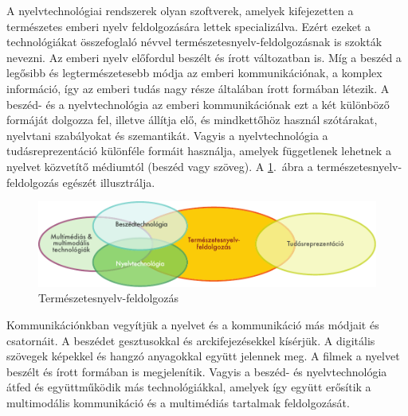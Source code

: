   \clearpage



  \begin{multicols}{2}

  A nyelvtechnológiai rendszerek olyan szoft\-ve\-rek, amelyek kifejezetten a természetes emberi nyelv feldolgozására lettek specializálva. Ezért ezeket a technológiákat összefoglaló névvel természetesnyelv-fel\-dol\-go\-zás\-nak is szokták nevezni. Az emberi nyelv előfordul beszélt és írott változatban is. Míg a beszéd a legősibb és legtermészetesebb módja az emberi kommunikációnak, a komplex információ, így az emberi tudás nagy része általában írott formában létezik. A beszéd- és a nyelvtechnológia az emberi kommunikációnak ezt a két különböző formáját dolgozza fel, illetve állítja elő, és mindkettőhöz használ szótárakat, nyelvtani szabályokat és szemantikát. Vagyis a nyelvtechnológia a tudásreprezentáció különféle formáit használja, amelyek függetlenek lehetnek a nyelvet közvetítő médiumtól (beszéd vagy szöveg). A \ref{fig:ltincontext_de}.~ábra a természetesnyelv-feldolgozás egészét illusztrálja.

  \begin{figure}[htb]
    \center
    \includegraphics[width=\textwidth]{../_media/hungarian/language_technologies}
    \caption{Természetesnyelv-feldolgozás}
    \label{fig:ltincontext_de}
  \end{figure}

  Kommunikációnkban ve\-gyít\-jük a nyelvet és a kommunikáció más módjait és csatornáit. A beszédet gesztusokkal és arckifejezésekkel kísérjük. A digitális szövegek képekkel és hangzó anyagokkal együtt jelennek meg. A filmek a nyelvet beszélt és írott formában is megjelenítik. Vagyis a beszéd- és nyelvtechnológia átfed és együttműködik más technológiákkal, amelyek így együtt erősítik a multimodális kommunikáció és a multimédiás tartalmak feldolgozását. 


\end{multicols}
